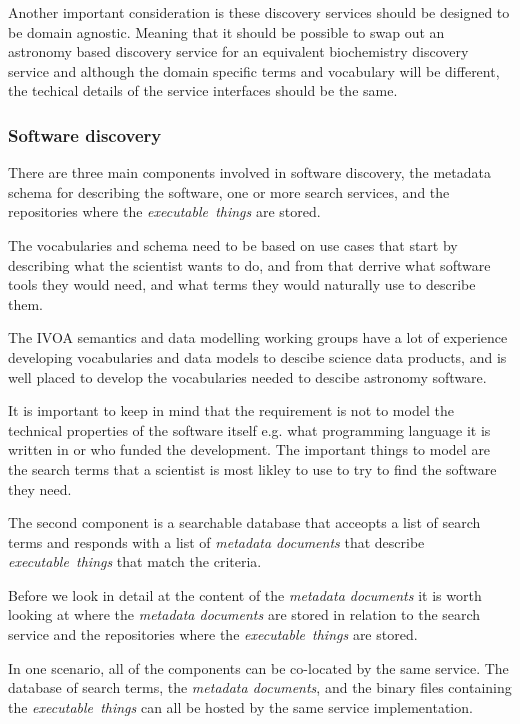 \documentclass[11pt,a4paper]{ivoa}
\newcommand{\ivoa} {IVOA}
\newcommand{\executablething}[1] {\textit{executable~thing#1}}
\newcommand{\metadoc} [1]{\textit{metadata document#1}}
\newcommand{\science}[1] {science#1}
\newcommand{\scientist}[1] {scientist#1}
\begin{document}
Another important consideration is these discovery services should be designed to be domain agnostic.
Meaning that it should be possible to swap out an astronomy based discovery service
for an equivalent biochemistry discovery service and although the domain specific
terms and vocabulary will be different, the techical details of the service interfaces
should be the same.

\subsubsection{Software discovery}
\label{subsub-software-discovery}

There are three main components involved in software discovery, the metadata schema for
describing the software, one or more search services, and the
repositories where the \executablething{s} are stored.

The vocabularies and schema need to be based on use cases that start by describing what the
\scientist{} wants to do, and from that derrive what software tools they would need, and what terms
they would naturally use to describe them.

The \ivoa{} semantics and data modelling working groups have a lot of experience developing
vocabularies and data models to descibe \science{} data products, and is well placed
to develop the vocabularies needed to descibe astronomy software.

It is important to keep in mind that the requirement is not to model the technical properties
of the software itself e.g. what programming language it is written in or who funded the development.
The important things to model are the search terms that a \scientist{} is most likley to use to try to
find the software they need.

The second component is a searchable database that acceopts a list of search terms and responds with a
list of \metadoc{s} that describe \executablething{s} that match the criteria.

Before we look in detail at the content of the \metadoc{s} it is worth looking at where the \metadoc{s} are
stored in relation to the search service and the repositories where the \executablething{s} are stored.

In one scenario, all of the components can be co-located by the same service.
The database of search terms, the \metadoc{s}, and the binary files containing the \executablething{s}
can all be hosted by the same service implementation.
\end{document}
